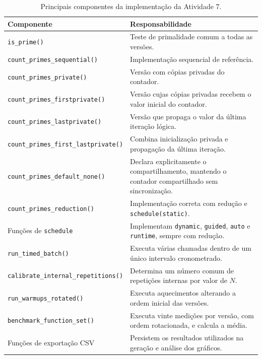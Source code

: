 \begin{table}[htbp]
\centering
\caption{Principais componentes da implementação da Atividade 7.}
\label{tab:atvd07-componentes}
\small
\begin{tabular}{|p{}|p{}|}
\hline
\textbf{Componente} & \textbf{Responsabilidade} \\
\hline
\texttt{is\_prime()} &
Teste de primalidade comum a todas as versões. \\
\hline

\texttt{count\_primes\_sequential()} &
Implementação sequencial de referência. \\
\hline

\texttt{count\_primes\_private()} &
Versão com cópias privadas do contador. \\
\hline

\texttt{count\_primes\_firstprivate()} &
Versão cujas cópias privadas recebem o valor inicial do contador. \\
\hline

\texttt{count\_primes\_lastprivate()} &
Versão que propaga o valor da última iteração lógica. \\
\hline

\texttt{count\_primes\_first\_lastprivate()} &
Combina inicialização privada e propagação da última iteração. \\
\hline

\texttt{count\_primes\_default\_none()} &
Declara explicitamente o compartilhamento, mantendo o contador
compartilhado sem sincronização. \\
\hline

\texttt{count\_primes\_reduction()} &
Implementação correta com redução e \texttt{schedule(static)}. \\
\hline

Funções de \texttt{schedule} &
Implementam \texttt{dynamic}, \texttt{guided}, \texttt{auto} e
\texttt{runtime}, sempre com redução. \\
\hline

\texttt{run\_timed\_batch()} &
Executa várias chamadas dentro de um único intervalo cronometrado. \\
\hline

\texttt{calibrate\_internal\_repetitions()} &
Determina um número comum de repetições internas por valor de \(N\). \\
\hline

\texttt{run\_warmups\_rotated()} &
Executa aquecimentos alterando a ordem inicial das versões. \\
\hline

\texttt{benchmark\_function\_set()} &
Executa vinte medições por versão, com ordem rotacionada, e calcula a
média. \\
\hline

Funções de exportação CSV &
Persistem os resultados utilizados na geração e análise dos gráficos. \\
\hline
\end{tabular}
\end{table}


